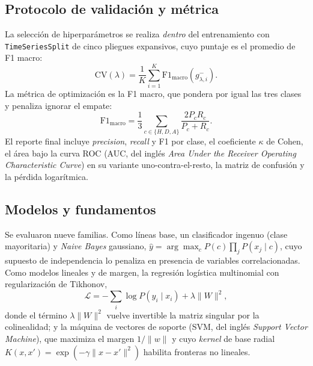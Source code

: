 \documentclass[conference]{IEEEtran}
\begin{document}
\subsection{Protocolo de validaci\'on y m\'etrica}
La selecci\'on de hiperpar\'ametros se realiza \emph{dentro} del entrenamiento con
\texttt{TimeSeriesSplit} de cinco pliegues expansivos, cuyo puntaje es el promedio de F1
macro:
\begin{equation}
\mathrm{CV}(\lambda)=\frac{1}{K}\sum_{i=1}^{K}\mathrm{F1}_{\text{macro}}\!\left(g^{-}_{\lambda,i}\right).
\end{equation}
La m\'etrica de optimizaci\'on es la F1 macro, que pondera por igual las tres
clases y penaliza ignorar el empate:
\begin{equation}
\mathrm{F1}_{\text{macro}}=\frac{1}{3}\sum_{c\in\{H,D,A\}}\frac{2P_cR_c}{P_c+R_c}.
\end{equation}
El reporte final incluye \emph{precision}, \emph{recall} y F1 por clase, el coeficiente
$\kappa$ de Cohen, el \'area bajo la curva ROC (AUC, del ingl\'es \emph{Area Under the
Receiver Operating Characteristic Curve}) en su variante uno-contra-el-resto, la matriz de
confusi\'on y la p\'erdida logar\'itmica.

\subsection{Modelos y fundamentos}
Se evaluaron nueve familias. Como l\'ineas base, un clasificador ingenuo
(clase mayoritaria) y \emph{Naive Bayes} gaussiano,
$\hat{y}=\arg\max_c P(c)\prod_j P(x_j\mid c)$, cuyo supuesto de independencia lo penaliza
en presencia de variables correlacionadas. Como modelos lineales y de margen, la
regresi\'on log\'istica multinomial con regularizaci\'on de Tikhonov,
\begin{equation}
\mathcal{L}=-\sum_i\log P(y_i\mid x_i)+\lambda\lVert W\rVert^2,
\end{equation}
donde el t\'ermino $\lambda\lVert W\rVert^2$ vuelve invertible la matriz singular por la
colinealidad; y la m\'aquina de vectores de soporte (SVM, del ingl\'es \emph{Support Vector
Machine}), que maximiza el margen $1/\lVert w\rVert$ y cuyo \emph{kernel} de base radial
$K(x,x')=\exp(-\gamma\lVert x-x'\rVert^2)$ habilita fronteras no lineales.
\end{document}
